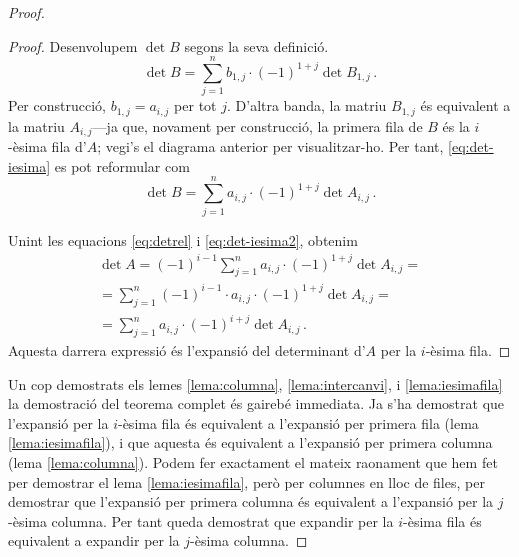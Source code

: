 \begin{teo}
\begin{proof}
\begin{lema}
\begin{adjustwidth}{0.8cm}{}
\begin{proof}
		Desenvolupem $\det B$ segons la seva definició.
		\begin{equation}\label{eq:det-iesima}
			\det B = \sum_{j=1}^{n} b_{1,j}\cdot (-1)^{1+j}\det B_{1,j}\,.
		\end{equation}
		Per construcció, $b_{1,j} = a_{i,j}$ per tot $j$. D'altra banda, la matriu $B_{1,j}$ és equivalent a la matriu $A_{i,j}$---ja que, novament per construcció, la primera fila de $B$ és la $i$-èsima fila d'$A$; vegi's el diagrama anterior per visualitzar-ho. Per tant, \eqref{eq:det-iesima} es pot reformular com
		\begin{equation}\label{eq:det-iesima2}
			\det B = \sum_{j=1}^{n} a_{i,j}\cdot (-1)^{1+j}\det A_{i,j}\,.
		\end{equation}
		
		Unint les equacions \eqref{eq:detrel} i \eqref{eq:det-iesima2}, obtenim
		\begin{multline}
			\det A = (-1)^{i-1}\sum_{j=1}^{n} a_{i,j}\cdot (-1)^{1+j}\det A_{i,j} =\\
			=\sum_{j=1}^{n} (-1)^{i-1}\cdot a_{i,j}\cdot (-1)^{1+j}\det A_{i,j}=\\
			=\sum_{j=1}^{n} a_{i,j}\cdot (-1)^{i+j}\det A_{i,j}\,.
		\end{multline}
		Aquesta darrera expressió és l'expansió del determinant d'$A$ per la $i$-èsima fila.
	\end{proof}
	\end{adjustwidth}
\end{lema}

Un cop demostrats els lemes \ref{lema:columna}, \ref{lema:intercanvi}, i \ref{lema:iesimafila} la demostració del teorema complet és gairebé immediata. Ja s'ha demostrat que l'expansió per la $i$-èsima fila és equivalent a l'expansió per primera fila (lema \ref{lema:iesimafila}), i que aquesta és equivalent a l'expansió per primera columna (lema \ref{lema:columna}). Podem fer exactament el mateix raonament que hem fet per demostrar el lema \ref{lema:iesimafila}, però per columnes en lloc de files, per demostrar que l'expansió per primera columna és equivalent a l'expansió per la $j$-èsima columna. Per tant queda demostrat que expandir per la $i$-èsima fila és equivalent a expandir per la $j$-èsima columna.

\end{proof}	


\end{teo}